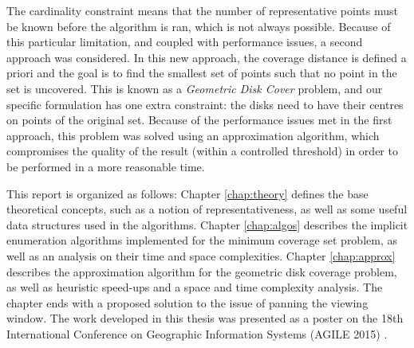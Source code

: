The cardinality constraint means that the number of representative points must be known before the algorithm is ran, which is not always possible. Because of this particular limitation, and coupled with performance issues, a second approach was considered. In this new approach, the coverage distance is defined a priori and the goal is to find the smallest set of points such that no point in the set is uncovered. This is known as a \emph{Geometric Disk Cover} \cite{gdccomplex} problem, and our specific formulation has one extra constraint: the disks need to have their centres on points of the original set. Because of the performance issues met in the first approach, this problem was solved using an approximation algorithm, which compromises the quality of the result (within a controlled threshold) in order to be performed in a more reasonable time. 

This report is organized as follows:
Chapter \ref{chap:theory} defines the base theoretical concepts, such as a notion of representativeness, as well as some useful data structures used in the algorithms. Chapter \ref{chap:algos} describes the implicit enumeration algorithms implemented for the minimum coverage set problem, as well as an analysis on their time and space complexities. Chapter \ref{chap:approx} describes the approximation algorithm for the geometric disk coverage problem, as well as heuristic speed-ups and a space and time complexity analysis. The chapter ends with a proposed solution to the issue of panning the viewing window. The work developed in this thesis was presented as a poster on the 18th International Conference on Geographic Information Systems (AGILE 2015) \cite{valenca}.